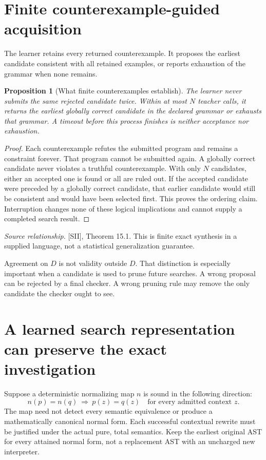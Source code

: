 \documentclass[11pt,oneside,openany]{book}
\newtheorem{proposition}[theorem]{Proposition}
\theoremstyle{definition}\newtheorem{definition}[theorem]{Definition}
\newcommand{\source}[1]{\par{\small\textit{Source relationship.} #1}\par}
\begin{document}
\section{Finite counterexample-guided acquisition}
The learner retains every returned counterexample. It proposes the earliest candidate consistent with all retained examples, or reports exhaustion of the grammar when none remains.

\begin{proposition}[What finite counterexamples establish]\label{r:cegis}
The learner never submits the same rejected candidate twice. Within at most $N$ teacher calls, it returns the earliest globally correct candidate in the declared grammar or exhausts that grammar. A timeout before this process finishes is neither acceptance nor exhaustion.
\end{proposition}
\begin{proof}
Each counterexample refutes the submitted program and remains a constraint forever. That program cannot be submitted again. A globally correct candidate never violates a truthful counterexample. With only $N$ candidates, either an accepted one is found or all are ruled out. If the accepted candidate were preceded by a globally correct candidate, that earlier candidate would still be consistent and would have been selected first. This proves the ordering claim. Interruption changes none of these logical implications and cannot supply a completed search result.
\end{proof}
\source{[SII], Theorem 15.1. This is finite exact synthesis in a supplied language, not a statistical generalization guarantee.}

Agreement on $D$ is not validity outside $D$. That distinction is especially important when a candidate is used to prune future searches. A wrong proposal can be rejected by a final checker. A wrong pruning rule may remove the only candidate the checker ought to see.

\section{A learned search representation can preserve the exact investigation}
Suppose a deterministic normalizing map $n$ is sound in the following direction:
\[
n(p)=n(q)\ \Longrightarrow\ p(z)=q(z)\quad\text{for every admitted context }z.
\]
The map need not detect every semantic equivalence or produce a mathematically canonical normal form. Each successful contextual rewrite must be justified under the actual pure, total semantics. Keep the earliest original AST for every attained normal form, not a replacement AST with an uncharged new interpreter.
\end{document}
